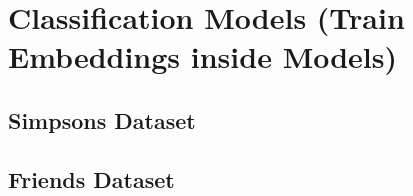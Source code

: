 \section{Classification Models (Train Embeddings inside Models)}

\subsection{Simpsons Dataset}

\subsection{Friends Dataset}